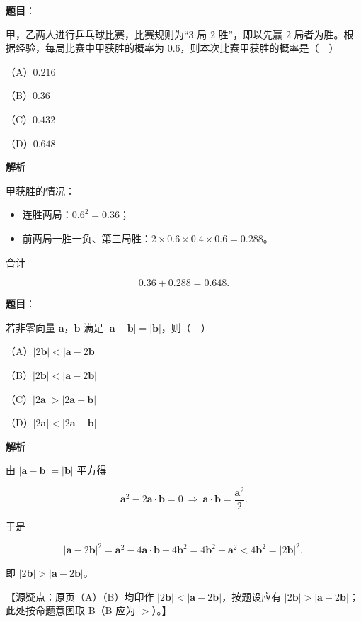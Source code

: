 \begin{answer}

\textbf{题目}：

甲，乙两人进行乒乓球比赛，比赛规则为“$3$ 局 $2$ 胜”，即以先赢 $2$ 局者为胜。根据经验，每局比赛中甲获胜的概率为 $0.6$，则本次比赛甲获胜的概率是（　）

（A）$0.216$

（B）$0.36$

（C）$0.432$

（D）$0.648$

\textbf{解析}

甲获胜的情况：

\begin{itemize}
\item 连胜两局：$0.6^2=0.36$；
\item 前两局一胜一负、第三局胜：$2\times0.6\times0.4\times0.6=0.288$。
\end{itemize}

合计

\nopagebreak[4]
\[0.36+0.288=0.648.\]


\end{answer}
\begin{answer}

\textbf{题目}：

若非零向量 $\boldsymbol a$，$\boldsymbol b$ 满足 $|\boldsymbol a-\boldsymbol b|=|\boldsymbol b|$，则（　）

（A）$|2\boldsymbol b|<|\boldsymbol a-2\boldsymbol b|$

（B）$|2\boldsymbol b|<|\boldsymbol a-2\boldsymbol b|$

（C）$|2\boldsymbol a|>|2\boldsymbol a-\boldsymbol b|$

（D）$|2\boldsymbol a|<|2\boldsymbol a-\boldsymbol b|$

\textbf{解析}

由 $|\boldsymbol a-\boldsymbol b|=|\boldsymbol b|$ 平方得

\nopagebreak[4]
\[\boldsymbol a^2-2\boldsymbol a\cdot\boldsymbol b=0\ \Rightarrow\ \boldsymbol a\cdot\boldsymbol b=\frac{\boldsymbol a^2}{2}.\]

于是

\nopagebreak[4]
\[|\boldsymbol a-2\boldsymbol b|^2=\boldsymbol a^2-4\boldsymbol a\cdot\boldsymbol b+4\boldsymbol b^2=4\boldsymbol b^2-\boldsymbol a^2<4\boldsymbol b^2=|2\boldsymbol b|^2,\]

即 $|2\boldsymbol b|>|\boldsymbol a-2\boldsymbol b|$。

【源疑点：原页（A）（B）均印作 $|2\boldsymbol b|<|\boldsymbol a-2\boldsymbol b|$，按题设应有 $|2\boldsymbol b|>|\boldsymbol a-2\boldsymbol b|$；此处按命题意图取 B（B 应为 $>$）。】


\end{answer}
